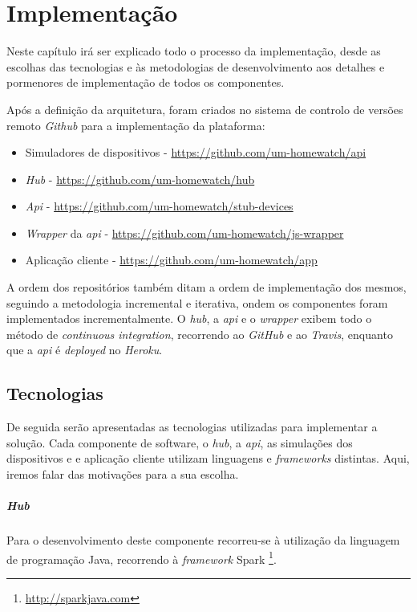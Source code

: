 \chapter{Implementação}

Neste capítulo irá ser explicado todo o processo da implementação, desde as escolhas das tecnologias e às metodologias de desenvolvimento aos detalhes e pormenores de implementação de todos os componentes.

Após a definição da arquitetura, foram criados no sistema de controlo de versões remoto \textit{Github} para a implementação da plataforma:
\begin{itemize}
    \item Simuladores de dispositivos - \url{https://github.com/um-homewatch/api}
    \item \textit{Hub} - \url{https://github.com/um-homewatch/hub}
    \item \textit{Api} - \url{https://github.com/um-homewatch/stub-devices}
    \item \textit{Wrapper} da \textit{api} - \url{https://github.com/um-homewatch/js-wrapper}
    \item Aplicação cliente - \url{https://github.com/um-homewatch/app}
\end{itemize}

A ordem dos repositórios também ditam a ordem de implementação dos mesmos, seguindo a metodologia incremental e iterativa, ondem os componentes foram implementados incrementalmente. O \textit{hub}, a \textit{api} e o \textit{wrapper} exibem todo o método de \textit{continuous integration}, recorrendo ao \textit{GitHub} e ao \textit{Travis}, enquanto que a \textit{api} é \textit{deployed} no \textit{Heroku}.

\section{Tecnologias}
De seguida serão apresentadas as tecnologias utilizadas para implementar a solução. Cada componente de software, o \textit{hub}, a \textit{api}, as simulações dos dispositivos e e aplicação cliente utilizam linguagens e \textit{frameworks} distintas. Aqui, iremos falar das motivações para a sua escolha.

\paragraph*{Hub}
Para o desenvolvimento deste componente recorreu-se à utilização da linguagem de programação Java, recorrendo à \textit{framework} Spark \footnote{\url{http://sparkjava.com}}. 

